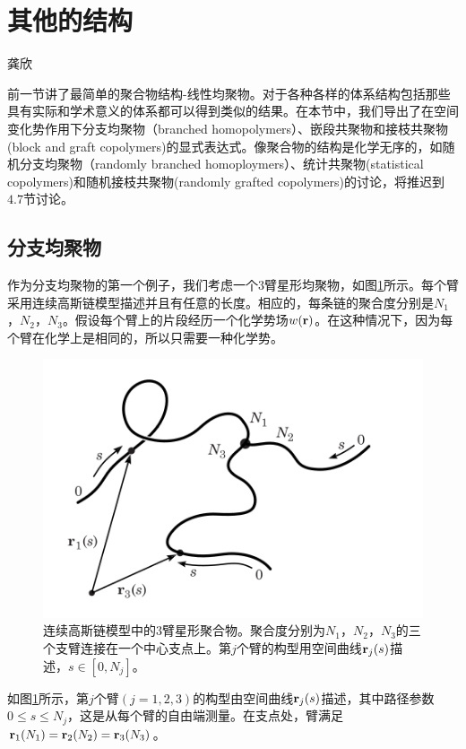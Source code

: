 \section{其他的结构}
{\color{red}\begin{center}
        龚欣
    \end{center}}

前一节讲了最简单的聚合物结构-线性均聚物。对于各种各样的体系结构包括那些具有实际和学术意义的体系都可以得到类似的结果。在本节中，我们导出了在空间变化势作用下分支均聚物（branched homopolymers）、嵌段共聚物和接枝共聚物(block and graft copolymers)的显式表达式。像聚合物的结构是化学无序的，如随机分支均聚物（randomly branched homoploymers）、统计共聚物(statistical copolymers)和随机接枝共聚物(randomly grafted copolymers)的讨论，将推迟到$4.7$节讨论。
\subsection{分支均聚物}
作为分支均聚物的第一个例子，我们考虑一个$3$臂星形均聚物，如图\ref{三臂星形均聚物}所示。每个臂采用连续高斯链模型描述并且有任意的长度。相应的，每条链的聚合度分别是$N_1$，$N_2$，$N_3$。假设每个臂上的片段经历一个化学势场$w (\mathbf{r})$。在这种情况下，因为每个臂在化学上是相同的，所以只需要一种化学势。
\begin{figure}[H]
\centering
\includegraphics[scale=0.7]{Contents/chapter3/figures/34.png}
\caption{连续高斯链模型中的$3$臂星形聚合物。聚合度分别为$N_1$，$N_2$，$N_3$的三个支臂连接在一个中心支点上。第$j$个臂的构型用空间曲线$\mathbf{r}_j(s)$描述，$s\in [0,N_j]$。}
\label{三臂星形均聚物}
\end{figure}

如图\ref{三臂星形均聚物}所示，第$j$个臂$(j=1,2,3)$的构型由空间曲线$\mathbf{r}_j(s)$描述，其中路径参数$0\leq s\leq N_j$，这是从每个臂的自由端测量。在支点处，臂满足$\mathbf{r}_1(N_1)=\mathbf{r}_2(N_2)=\mathbf{r}_3(N_3)$。

